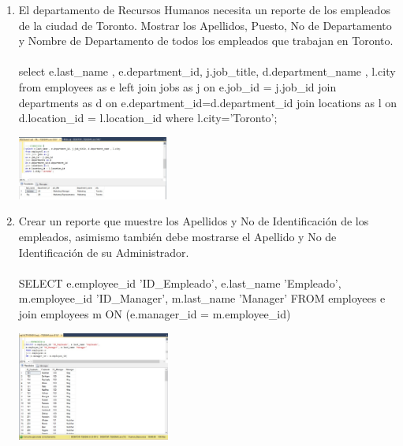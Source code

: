 \begin{enumerate}[1.]
	\item El departamento de Recursos Humanos necesita un reporte de los empleados de la ciudad de Toronto. Mostrar los Apellidos, Puesto, No de Departamento y Nombre de Departamento de todos los empleados que trabajan en Toronto.
\\
\\select e.last_name , e.department_id, j.job_title, d.department_name , l.city 
from employees as e 
left join jobs as j 
on e.job\_id = j.job_id
join departments as d
on e.department\_id=d.department\_id
join locations as l 
on d.location\_id = l.location\_id
where l.city='Toronto';\\

	\begin{center}
	\includegraphics[width=5cm]{./Imagenes/8ejer3} 
	\end{center}

	\item Crear un reporte que muestre los Apellidos y No de Identificación de los empleados, asimismo también
debe mostrarse el Apellido y No de Identificaci\'on de su Administrador.
\\
\\SELECT e.employee\_id 'ID\_Empleado', e.last\_name 'Empleado', 
m.employee\_id 'ID\_Manager', m.last\_name 'Manager' 
FROM employees e 
join employees m 
ON (e.manager\_id = m.employee\_id)\\


	\begin{center}
	\includegraphics[width=5cm]{./Imagenes/8ejer4} 
	\end{center}


\end{enumerate}

